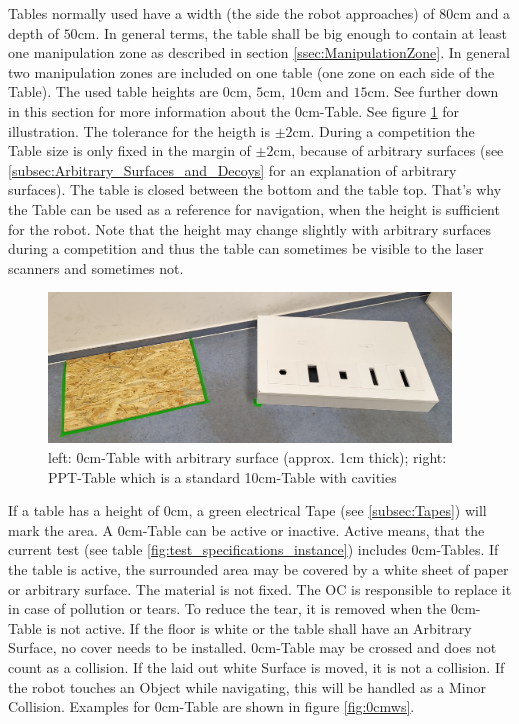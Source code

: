 Tables normally used have a width (the side the robot approaches) of $80\si{\centi\meter}$ and a depth of $50\si{\centi\meter}$. In general terms, the table shall be big enough to contain at least one manipulation zone as described in section \ref{ssec:ManipulationZone}. In general two manipulation zones are included on one table (one zone on each side of the Table). The used table heights are $0\si{\centi\meter}$, $5\si{\centi\meter}$, $10\si{\centi\meter}$ and $15\si{\centi\meter}$. See further down in this section for more information about the $0\si{\centi\meter}$-Table. See figure \ref{fig:ws} for illustration. 
The tolerance for the heigth is $\pm 2 \si{\centi\meter}$. During a competition the Table size is only fixed in the margin of $\pm 2 \si{\centi\meter}$, because of arbitrary surfaces (see \ref{subsec:Arbitrary_Surfaces_and_Decoys} for an explanation of arbitrary surfaces). 
The table is closed between the bottom and the table top. That's why the Table can be used as a reference for navigation, when the height is sufficient for the robot. Note that the height may change slightly with arbitrary surfaces during a competition and thus the table can sometimes be visible to the laser scanners and sometimes not. 
 
\begin{figure} [h!]
	\begin{center}
		\includegraphics[height = 4cm]{./images/arena/tables_small.jpg}	
	\end{center}
	\caption{left: 0\si{\centi\meter}-Table with arbitrary surface (approx. 1\si{\centi\meter} thick); right: PPT-Table which is a standard 10\si{\centi\meter}-Table with cavities}
	\label{fig:ws}
\end{figure}

If a table has a height of $0\si{\centi\meter}$, a green electrical Tape (see \ref{subsec:Tapes}) will mark the area. A $0\si{\centi\meter}$-Table can be active or inactive. Active means, that the current test (see table \ref{fig:test_specifications_instance}) includes $0\si{\centi\meter}$-Tables.
If the table is active, the surrounded area may be covered by a white sheet of paper or arbitrary surface. The material is not fixed.
The OC is responsible to replace it in case of pollution or tears. To reduce the tear, it is removed when the $0\si{\centi\meter}$-Table is not active. If the floor is white or the table shall have an Arbitrary Surface, no cover needs to be installed.
$0\si{\centi\meter}$-Table may be crossed and does not count as a collision. If the laid out white Surface is moved, it is not a collision.
If the robot touches an Object while navigating, this will be handled as a Minor Collision. Examples for $0\si{\centi\meter}$-Table are shown in figure \ref{fig:0cmws}.



